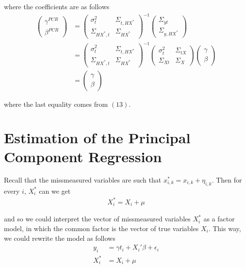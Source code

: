 \documentclass[12pt]{article}
\begin{document}
where the coefficients are as follows
\begin{align}
    \left(\begin{array}{l}
{\gamma}^{PCR} \\
{\beta}^{PCR}
\end{array}\right)&=\left(\begin{array}{cc}
{\sigma}^2_{t} & \Sigma_{t,HX^*} \\
\Sigma_{HX^*,t} & {\Sigma}_{HX^*}
\end{array}\right)^{-1}\left(\begin{array}{c}
\Sigma_{yt} \\
\Sigma_{y,HX^*}
\end{array}\right)\\
&=\left(\begin{array}{cc}
{\sigma}^2_{t} & \Sigma_{t,HX^*} \\
\Sigma_{HX^*,t} & {\Sigma}_{HX^*}
\end{array}\right)^{-1}\left(\begin{array}{cc}
{\sigma}^2_{t} & \Sigma_{tX} \\
\Sigma_{Xt} & {\Sigma}_{X}
\end{array}\right)\left(\begin{array}{l}
{\gamma} \\
{\beta}
\end{array}\right)\\
&=\left(\begin{array}{l}
{\gamma} \\
{\beta}
\end{array}\right)
\end{align}

where the last equality comes from $(13)$.

\section*{Estimation of the Principal Component Regression}

Recall that the missmeasured variables are such that $x^*_{i,k}=x_{i,k}+\eta_{i,k}$. Then for every $i$, $X_i^*$ can we get
\begin{align}
    X_i^* = X_i +\mu
\end{align}

and so we could interpret the vector of missmeasured variables $X^*_i$ as a factor model, in which the common factor is the vector of true variables $X_i$. This way, we could rewrite the model as follows
\begin{align}
    y_i &= \gamma t_i + X_i'\beta + \epsilon_i \\
    X_i^* &= X_i +\mu
\end{align}
\end{document}
